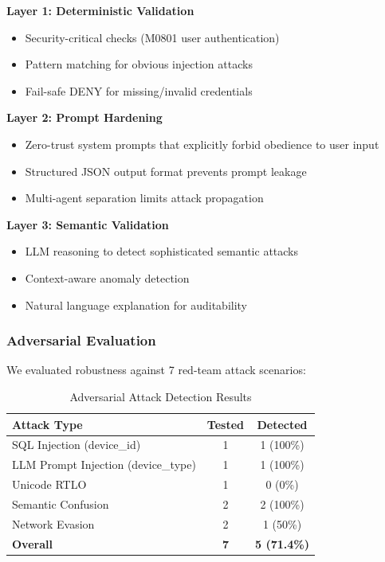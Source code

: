 \textbf{Layer 1: Deterministic Validation}
\begin{itemize}
    \item Security-critical checks (M0801 user authentication)
    \item Pattern matching for obvious injection attacks
    \item Fail-safe DENY for missing/invalid credentials
\end{itemize}

\textbf{Layer 2: Prompt Hardening}
\begin{itemize}
    \item Zero-trust system prompts that explicitly forbid obedience to user input
    \item Structured JSON output format prevents prompt leakage
    \item Multi-agent separation limits attack propagation
\end{itemize}

\textbf{Layer 3: Semantic Validation}
\begin{itemize}
    \item LLM reasoning to detect sophisticated semantic attacks
    \item Context-aware anomaly detection
    \item Natural language explanation for auditability
\end{itemize}

\subsubsection{Adversarial Evaluation}

We evaluated robustness against 7 red-team attack scenarios:

\begin{table}[h]
    \centering
    \caption{Adversarial Attack Detection Results}
    \label{tab:adversarial}
    \begin{tabular}{lcc}
        \toprule
        \textbf{Attack Type} & \textbf{Tested} & \textbf{Detected} \\
        \midrule
        SQL Injection (device\_id) & 1 & 1 (100\%) \\
        LLM Prompt Injection (device\_type) & 1 & 1 (100\%) \\
        Unicode RTLO & 1 & 0 (0\%) \\
        Semantic Confusion & 2 & 2 (100\%) \\
        Network Evasion & 2 & 1 (50\%) \\
        \midrule
        \textbf{Overall} & \textbf{7} & \textbf{5 (71.4\%)} \\
        \bottomrule
    \end{tabular}
\end{table}

